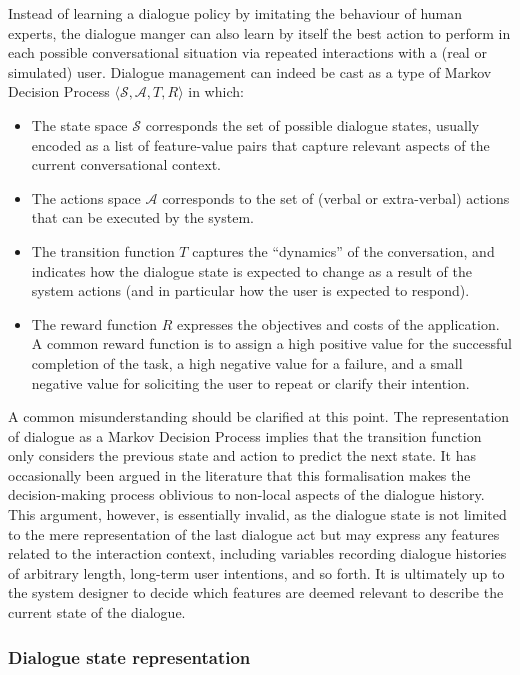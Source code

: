 Instead of learning a dialogue policy by imitating the behaviour of human experts, the dialogue manger can also learn by itself the best action to perform in each possible conversational situation via repeated interactions with a (real or simulated) user.  Dialogue management can indeed be cast as a type of Markov Decision Process $\langle \mathcal{S}, \mathcal{A}, T, R \rangle$ in which: 
\begin{itemize}
\item The state space $\mathcal{S}$ corresponds the set of possible dialogue states, usually encoded as a list of feature-value pairs that capture relevant aspects of the current conversational context.
\item The actions space $\mathcal{A}$ corresponds to the set of (verbal or extra-verbal) actions that can be executed by the system.
\item The transition function $T$ captures the ``dynamics'' of the conversation, and indicates how the dialogue state is expected to change as a result of the system actions (and in particular how the user is expected to respond). 
\item The reward function $R$ expresses the objectives and costs of the application. A common reward function is to assign a high positive value for the successful completion of the task, a high negative value for a failure, and a small negative value for soliciting the user to repeat or clarify their intention.  
\end{itemize}

A common misunderstanding should be clarified at this point. The representation of dialogue as a Markov Decision Process implies that the transition function only considers the previous state and action to predict the next state.  It has occasionally been argued in the literature that this formalisation makes the decision-making process oblivious to non-local aspects of the dialogue history. This argument, however, is essentially invalid, as the dialogue state is not limited to the mere representation of the last dialogue act but may express any features related to the interaction context, including variables recording dialogue histories of arbitrary length, long-term user intentions, and so forth.  It is ultimately up to the system designer to decide which features are deemed relevant to describe the current state of the dialogue. 

\subsubsection*{Dialogue state representation}

